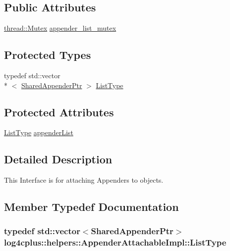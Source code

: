 \subsection*{Public Attributes}
\begin{DoxyCompactItemize}
\item 
\hyperlink{classlog4cplus_1_1thread_1_1Mutex}{thread\-::\-Mutex} \hyperlink{classlog4cplus_1_1helpers_1_1AppenderAttachableImpl_a2542b14426c5c7a98ca4a5eed51bbbda}{appender\-\_\-list\-\_\-mutex}
\end{DoxyCompactItemize}
\subsection*{Protected Types}
\begin{DoxyCompactItemize}
\item 
typedef std\-::vector\\*
$<$ \hyperlink{namespacelog4cplus_a12d841b842c72396be9219ce67a0c215}{Shared\-Appender\-Ptr} $>$ \hyperlink{classlog4cplus_1_1helpers_1_1AppenderAttachableImpl_ab5d58fc9260395fad281bb2eaea20582}{List\-Type}
\end{DoxyCompactItemize}
\subsection*{Protected Attributes}
\begin{DoxyCompactItemize}
\item 
\hyperlink{classlog4cplus_1_1helpers_1_1AppenderAttachableImpl_ab5d58fc9260395fad281bb2eaea20582}{List\-Type} \hyperlink{classlog4cplus_1_1helpers_1_1AppenderAttachableImpl_a005e2cff7327ca132a173e088aefe660}{appender\-List}
\end{DoxyCompactItemize}


\subsection{Detailed Description}
This Interface is for attaching Appenders to objects. 

\subsection{Member Typedef Documentation}
\hypertarget{classlog4cplus_1_1helpers_1_1AppenderAttachableImpl_ab5d58fc9260395fad281bb2eaea20582}{
\subsubsection[{List\-Type}]{\setlength{\rightskip}{0pt plus 5cm}typedef std\-::vector$<${\bf Shared\-Appender\-Ptr}$>$ {\bf log4cplus\-::helpers\-::\-Appender\-Attachable\-Impl\-::\-List\-Type}\hspace{0.3cm}{\ttfamily [protected]}}}\label{classlog4cplus_1_1helpers_1_1AppenderAttachableImpl_ab5d58fc9260395fad281bb2eaea20582}


